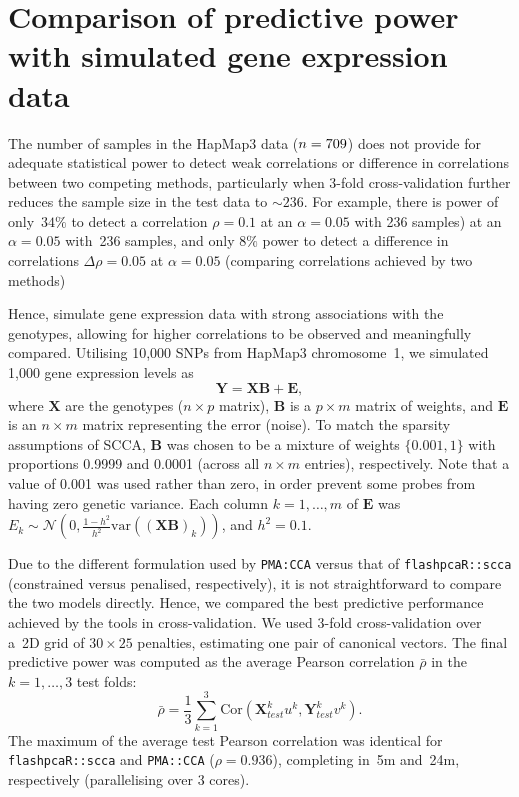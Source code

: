 \documentclass[a4paper,10pt]{article}
\begin{document}
\section{Comparison of predictive power with simulated gene expression data}
\label{section:sim}

The number of samples in the HapMap3 data ($n=709$) does not provide
for adequate statistical power to detect weak correlations or difference
in correlations between two competing methods, particularly when 3-fold
cross-validation further reduces the sample size in the test data to
${\sim}236$. For example, there is power of only~$34\%$ to detect a correlation
$\rho=0.1$ at an $\alpha=0.05$ with 236 samples) at an $\alpha=0.05$ with~236
samples, and only $8\%$ power to detect a difference in correlations $\Delta
\rho=0.05$ at $\alpha=0.05$ (comparing correlations achieved by two methods)


Hence, simulate gene expression data with strong associations with the
genotypes, allowing for higher correlations to be observed and meaningfully
compared.  Utilising 10,000 SNPs from HapMap3 chromosome~1, we simulated 1,000 gene
expression levels as
$$
\mathbf{Y} = \mathbf{X} \mathbf{B} + \mathbf{E},
$$
where $\mathbf{X}$ are the genotypes ($n \times p$ matrix), $\mathbf{B}$
is a $p \times m$ matrix of weights, and $\mathbf{E}$ is an $n \times m$
matrix representing the error (noise). To match the sparsity assumptions
of SCCA, $\mathbf{B}$ was chosen to be a mixture of weights $\{0.001, 1\}$
with proportions 0.9999 and 0.0001 (across all $n \times m$ entries),
respectively.  Note that a value of 0.001 was used rather than zero, in
order prevent some probes from having zero genetic variance. Each column
$k=1,\hdots,m$ of $\mathbf{E}$ was $E_k \sim \mathcal{N}(0, \frac{1-h^2}{h^2}
\mbox{var}((\mathbf{X}\mathbf{B})_k))$, and $h^2=0.1$.

Due to the different formulation used by \texttt{PMA:CCA} versus that of
\texttt{flashpcaR::scca} (constrained versus penalised, respectively), it is
not straightforward to compare the two models directly. Hence, we compared
the best predictive performance achieved by the tools in cross-validation.
We used 3-fold cross-validation over a~2D grid of $30\times25$ penalties,
estimating one pair of canonical vectors. The final predictive power was
computed as the average Pearson correlation $\bar{\rho}$ in the~$k=1,\hdots,3$
test folds:
$$
\bar{\rho} = \frac{1}{3} \sum_{k=1}^3
   \mbox{Cor}(\mathbf{X}_{test}^k u^k, \mathbf{Y}_{test}^k v^k).
$$
The maximum of the average test Pearson correlation was identical for
\texttt{flashpcaR::scca} and \texttt{PMA::CCA} ($\rho{=}0.936$), completing
in~5m and~24m, respectively (parallelising over 3 cores).
\end{document}

